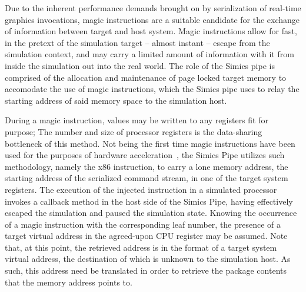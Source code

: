 Due to the inherent performance demands brought on by serialization of real-time graphics invocations, magic instructions are a suitable candidate for the exchange of information between target and host system.
Magic instructions allow for fast, in the pretext of the simulation target -- almost instant -- escape from the simulation context, and may carry a limited amount of information with it from inside the simulation out into the real world.
The role of the Simics pipe is comprised of the allocation and maintenance of page locked target memory to accomodate the use of magic instructions, which the Simics pipe uses to relay the starting address of said memory space to the simulation host.

During a magic instruction, values may be written to any registers fit for purpose; The number and size of processor registers is the data-sharing bottleneck of this method.
Not being the first time magic instructions have been used for the purposes of hardware acceleration~, the Simics Pipe utilizes such methodology, namely the  x86 instruction, to carry a lone memory address, the starting address of the serialized command stream, in one of the target system registers.
The execution of the injected instruction in a simulated processor invokes a callback method in the host side of the Simics Pipe, having effectively escaped the simulation and paused the simulation state.
Knowing the occurrence of a magic instruction with the corresponding leaf number, the presence of a target virtual address in the agreed-upon CPU register may be assumed.
Note that, at this point, the retrieved address is in the format of a target system virtual address, the destination of which is unknown to the simulation host.
As such, this address need be translated in order to retrieve the package contents that the memory address points to.

